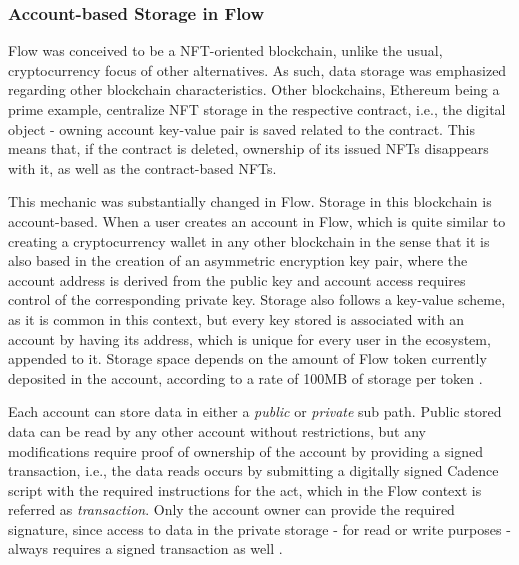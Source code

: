 \subsubsection{Account-based Storage in Flow}
Flow was conceived to be a NFT-oriented blockchain, unlike the usual, cryptocurrency focus of other alternatives. As such, data storage was emphasized regarding other blockchain characteristics. Other blockchains, Ethereum being a prime example, centralize NFT storage in the respective contract, i.e., the digital object - owning account key-value pair is saved related to the contract. This means that, if the contract is deleted, ownership of its issued NFTs disappears with it, as well as the contract-based NFTs.
\par
This mechanic was substantially changed in Flow. Storage in this blockchain is account-based. When a user creates an account in Flow, which is quite similar to creating a cryptocurrency wallet in any other blockchain in the sense that it is also based in the creation of an asymmetric encryption key pair, where the account address is derived from the public key and account access requires control of the corresponding private key. Storage also follows a key-value scheme, as it is common in this context, but every key stored is associated with an account by having its address, which is unique for every user in the ecosystem, appended to it. Storage space depends on the amount of Flow token currently deposited in the account, according to a rate of 100MB of storage per token \cite{flow2020b}.
\par
Each account can store data in either a \textit{public} or \textit{private} sub path. Public stored data can be read by any other account without restrictions, but any modifications require proof of ownership of the account by providing a signed transaction, i.e., the data reads occurs by submitting a digitally signed Cadence script with the required instructions for the act, which in the Flow context is referred as \textit{transaction}. Only the account owner can provide the required signature, since access to data in the private storage - for read or write purposes - always requires a signed transaction as well \cite{Hentschel2019a}.

